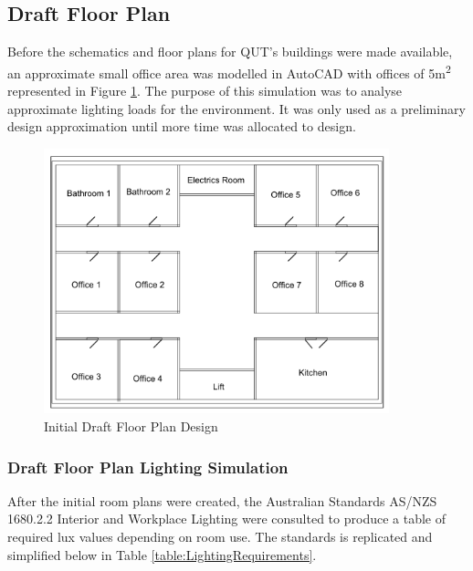 \subsection{Draft Floor Plan} \label{section:draft-floor-plan}

Before the schematics and floor plans for QUT's buildings were made available, an approximate small office area was modelled in AutoCAD with offices of 5\si{m^2} represented in Figure \ref{fig:RoughFloorplan}. The purpose of this simulation was to analyse approximate lighting loads for the environment. It was only used as a preliminary design approximation until more time was allocated to design.  

\begin{figure}[H]
	\hfill\includegraphics[width = 100mm]{images/Rough_Floorplan}\hspace*{\fill}
	\caption{Initial Draft Floor Plan Design} 
	\label{fig:RoughFloorplan}
\end{figure} 

\subsubsection{Draft Floor Plan Lighting Simulation}

After the initial room plans were created, the Australian Standards AS/NZS 1680.2.2 Interior and Workplace Lighting were consulted to produce a table of required lux values depending on room use. The standards is replicated and simplified below in Table \ref{table:LightingRequirements}.

